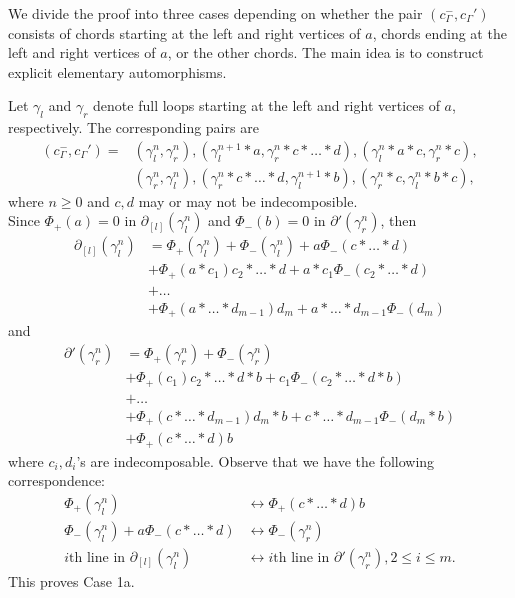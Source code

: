 \documentclass[11pt]{amsart}
\makeatletter
\renewenvironment{proof}[1][\proofname] {\par\pushQED{\qed}{\normalfont\bfseries\topsep6\p@\@plus6\p@\relax #1\@addpunct{.} }}{\popQED\endtrivlist\@endpefalse}
\theoremstyle{mystyle}
\newcommand{\<}{\langle}
\renewcommand{\>}{\rangle}
\makeatother
\begin{document}
\begin{proof}
    We divide the proof into three cases depending on whether the pair $(c_\Gamma^-, c_\Gamma')$ consists of chords starting at the left and right vertices of $a$, chords ending at the left and right vertices of $a$, or the other chords. The main idea is to construct explicit elementary automorphisms.
    
     Let $\gamma_l$ and $\gamma_r$ denote full loops starting at the left and right vertices of $a$, respectively. The corresponding pairs are \begin{align*}
        (c_\Gamma^-, c_\Gamma') = &(\gamma_l^n, \gamma_r^n), (\gamma_l^{n+1} * a, \gamma_r^n * c * \dots  * d), (\gamma_l^n * a * c, \gamma_r^n * c), \\
        &(\gamma_r^n, \gamma_l^n), (\gamma_r^n * c * \dots  * d, \gamma_l^{n+1} * b), (\gamma_r^n * c, \gamma_l^n * b * c),        
    \end{align*} where $n \geq 0$ and $c, d$ may or may not be indecomposible. \\
    
     Since $\Phi_+(a) = 0$ in $\partial_{[l]}(\gamma_l^n)$ and $\Phi_-(b) = 0$ in $\partial'(\gamma_r^n)$, then \begin{align*}
        \partial_{[l]}(\gamma_l^n) &= \Phi_+(\gamma_l^n) + \Phi_-(\gamma_l^n) + a\Phi_-(c * \dots  * d) \\
        &+ \Phi_+(a * c_1) c_2 * \dots  * d + a*c_1 \Phi_-(c_2 * \dots  * d) \\
        &+ \ldots \\
        &+ \Phi_+(a * \dots  * d_{m-1}) d_m + a * \dots  * d_{m-1} \Phi_-(d_m)
    \end{align*} and \begin{align*}
        \partial'(\gamma_r^n) &= \Phi_+(\gamma_r^n) + \Phi_-(\gamma_r^n) \\
        &+ \Phi_+(c_1) c_2 * \dots  * d * b + c_1\Phi_-(c_2 * \dots  * d * b) \\
        &+ \ldots \\
        &+ \Phi_+(c * \dots  * d_{m-1}) d_m * b + c * \dots  * d_{m-1} \Phi_-(d_m * b) \\
        &+ \Phi_+(c * \dots  * d)b
    \end{align*} where $c_i, d_i$'s are indecomposable. Observe that we have the following correspondence:
    \begin{align*}
        \Phi_+(\gamma_l^n) &\leftrightarrow \Phi_+(c * \dots  * d)b \\
        \Phi_-(\gamma_l^n) + a\Phi_-(c * \dots  * d) &\leftrightarrow \Phi_-(\gamma_r^n) \\
        i\text{th line in } \partial_{[l]}(\gamma_l^n) &\leftrightarrow i\text{th line in } \partial'(\gamma_r^n), 2 \leq i \leq m.
    \end{align*} This proves Case 1a. \\


\end{proof}
\end{document}
